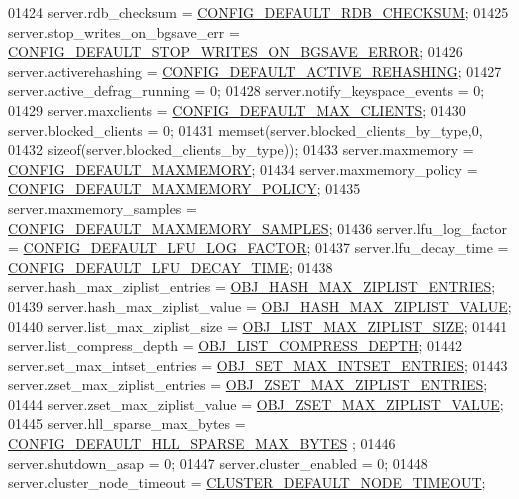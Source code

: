 \begin{DoxyCode}
{{{{{{{{{{{{{{{01424     server.rdb\_checksum = \hyperlink{server_8h_a549382a72b7490f18a44f03e2dbe5568}{CONFIG\_DEFAULT\_RDB\_CHECKSUM};
01425     server.stop\_writes\_on\_bgsave\_err = 
      \hyperlink{server_8h_a050e337ffdb94f18e190cc6d6d851196}{CONFIG\_DEFAULT\_STOP\_WRITES\_ON\_BGSAVE\_ERROR};
01426     server.activerehashing = \hyperlink{server_8h_a147863f3b338d25f54e026d88a487010}{CONFIG\_DEFAULT\_ACTIVE\_REHASHING};
01427     server.active\_defrag\_running = 0;
01428     server.notify\_keyspace\_events = 0;
01429     server.maxclients = \hyperlink{server_8h_ab24065d7a9205264189681ab4e4d410e}{CONFIG\_DEFAULT\_MAX\_CLIENTS};
01430     server.blocked\_clients = 0;
01431     memset(server.blocked\_clients\_by\_type,0,
01432            \textcolor{keyword}{sizeof}(server.blocked\_clients\_by\_type));
01433     server.maxmemory = \hyperlink{server_8h_a314eacfa28e22254ee8cc05f2b257281}{CONFIG\_DEFAULT\_MAXMEMORY};
01434     server.maxmemory\_policy = \hyperlink{server_8h_a5b8590d1c7aa090e48b9506c0842d206}{CONFIG\_DEFAULT\_MAXMEMORY\_POLICY};
01435     server.maxmemory\_samples = \hyperlink{server_8h_a38e65004c240be8a04ab492731c7da50}{CONFIG\_DEFAULT\_MAXMEMORY\_SAMPLES};
01436     server.lfu\_log\_factor = \hyperlink{server_8h_ab343786c44a1885885a1ac254b724317}{CONFIG\_DEFAULT\_LFU\_LOG\_FACTOR};
01437     server.lfu\_decay\_time = \hyperlink{server_8h_a24a132a96a693133fc057a491080aebf}{CONFIG\_DEFAULT\_LFU\_DECAY\_TIME};
01438     server.hash\_max\_ziplist\_entries = \hyperlink{server_8h_a41a8473748a5eeafbd30b20f22177c51}{OBJ\_HASH\_MAX\_ZIPLIST\_ENTRIES};
01439     server.hash\_max\_ziplist\_value = \hyperlink{server_8h_a63842e277a2ccef80f42cbae07c9f5d8}{OBJ\_HASH\_MAX\_ZIPLIST\_VALUE};
01440     server.list\_max\_ziplist\_size = \hyperlink{server_8h_a27c7e814708df2c7eed37fbc6ac0b7f1}{OBJ\_LIST\_MAX\_ZIPLIST\_SIZE};
01441     server.list\_compress\_depth = \hyperlink{server_8h_a7b811522f7befdc10e69883f360e45b4}{OBJ\_LIST\_COMPRESS\_DEPTH};
01442     server.set\_max\_intset\_entries = \hyperlink{server_8h_a333fe7f520eb6f33cd1c88e4691de3ed}{OBJ\_SET\_MAX\_INTSET\_ENTRIES};
01443     server.zset\_max\_ziplist\_entries = \hyperlink{server_8h_ac29d7218c448fac5b27039cf0d73fde2}{OBJ\_ZSET\_MAX\_ZIPLIST\_ENTRIES};
01444     server.zset\_max\_ziplist\_value = \hyperlink{server_8h_a24b004e72489e83f721bdd334234aa49}{OBJ\_ZSET\_MAX\_ZIPLIST\_VALUE};
01445     server.hll\_sparse\_max\_bytes = \hyperlink{server_8h_a479f69398ffb0f86fdbb4fa03876bc69}{CONFIG\_DEFAULT\_HLL\_SPARSE\_MAX\_BYTES}
      ;
01446     server.shutdown\_asap = 0;
01447     server.cluster\_enabled = 0;
01448     server.cluster\_node\_timeout = \hyperlink{cluster_8h_acb94b0516dcfb9814e13dfe97f3ad6b1}{CLUSTER\_DEFAULT\_NODE\_TIMEOUT};
}}}}}}}}}}}}}}}
\end{DoxyCode}
